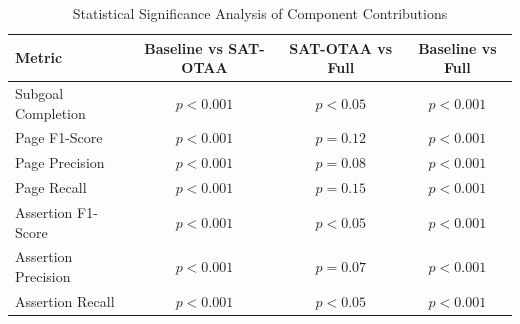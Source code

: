 
\begin{table}[htbp]
\centering
\caption{Statistical Significance Analysis of Component Contributions}
\label{tab:statistical_significance}
\begin{tabular}{@{}lccc@{}}
\toprule
\textbf{Metric} & \textbf{Baseline vs SAT-OTAA} & \textbf{SAT-OTAA vs Full} & \textbf{Baseline vs Full} \\
\midrule
Subgoal Completion & $p < 0.001$ & $p < 0.05$ & $p < 0.001$ \\
Page F1-Score & $p < 0.001$ & $p = 0.12$ & $p < 0.001$ \\
Page Precision & $p < 0.001$ & $p = 0.08$ & $p < 0.001$ \\
Page Recall & $p < 0.001$ & $p = 0.15$ & $p < 0.001$ \\
Assertion F1-Score & $p < 0.001$ & $p < 0.05$ & $p < 0.001$ \\
Assertion Precision & $p < 0.001$ & $p = 0.07$ & $p < 0.001$ \\
Assertion Recall & $p < 0.001$ & $p < 0.05$ & $p < 0.001$ \\
\bottomrule
\end{tabular}
\end{table}
